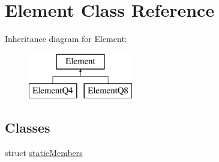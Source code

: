 \hypertarget{class_element}{}\section{Element Class Reference}
\label{class_element}
Inheritance diagram for Element\+:\begin{figure}[H]
\begin{center}
\leavevmode
\includegraphics[height=2.000000cm]{class_element}
\end{center}
\end{figure}
\subsection*{Classes}
\begin{DoxyCompactItemize}
\item 
struct \mbox{\hyperlink{struct_element_1_1static_members}{static\+Members}}
\end{DoxyCompactItemize}

